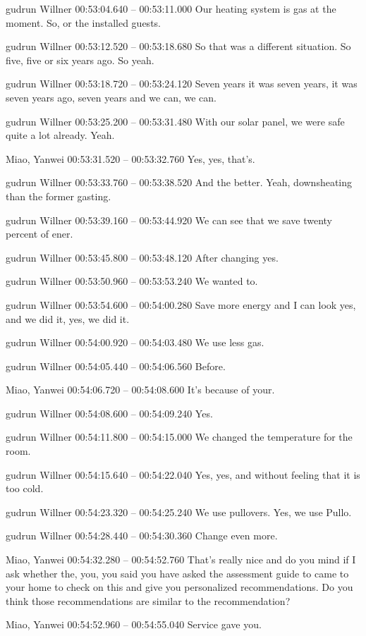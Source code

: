 {gudrun Willner 00:53:04.640 -- 00:53:11.000
Our heating system is gas at the moment. So, or the installed guests.

gudrun Willner 00:53:12.520 -- 00:53:18.680
So that was a different situation. So five, five or six years ago. So yeah.

gudrun Willner 00:53:18.720 -- 00:53:24.120
Seven years it was seven years, it was seven years ago, seven years and we can, we can.

gudrun Willner 00:53:25.200 -- 00:53:31.480
With our solar panel, we were safe quite a lot already. Yeah.

Miao, Yanwei 00:53:31.520 -- 00:53:32.760
Yes, yes, that's.

gudrun Willner 00:53:33.760 -- 00:53:38.520
And the better. Yeah, downsheating than the former gasting.

gudrun Willner 00:53:39.160 -- 00:53:44.920
We can see that we save twenty percent of ener.

gudrun Willner 00:53:45.800 -- 00:53:48.120
After changing yes.

gudrun Willner 00:53:50.960 -- 00:53:53.240
We wanted to.

gudrun Willner 00:53:54.600 -- 00:54:00.280
Save more energy and I can look yes, and we did it, yes, we did it.

gudrun Willner 00:54:00.920 -- 00:54:03.480
We use less gas.

gudrun Willner 00:54:05.440 -- 00:54:06.560
Before.

Miao, Yanwei 00:54:06.720 -- 00:54:08.600
It's because of your.

gudrun Willner 00:54:08.600 -- 00:54:09.240
Yes.

gudrun Willner 00:54:11.800 -- 00:54:15.000
We changed the temperature for the room.

gudrun Willner 00:54:15.640 -- 00:54:22.040
Yes, yes, and without feeling that it is too cold.

gudrun Willner 00:54:23.320 -- 00:54:25.240
We use pullovers. Yes, we use Pullo.

gudrun Willner 00:54:28.440 -- 00:54:30.360
Change even more.

Miao, Yanwei 00:54:32.280 -- 00:54:52.760
That's really nice and do you mind if I ask whether the, you, you said you have asked the assessment guide to came to your home to check on this and give you personalized recommendations. Do you think those recommendations are similar to the recommendation?

Miao, Yanwei 00:54:52.960 -- 00:54:55.040
Service gave you.

}
